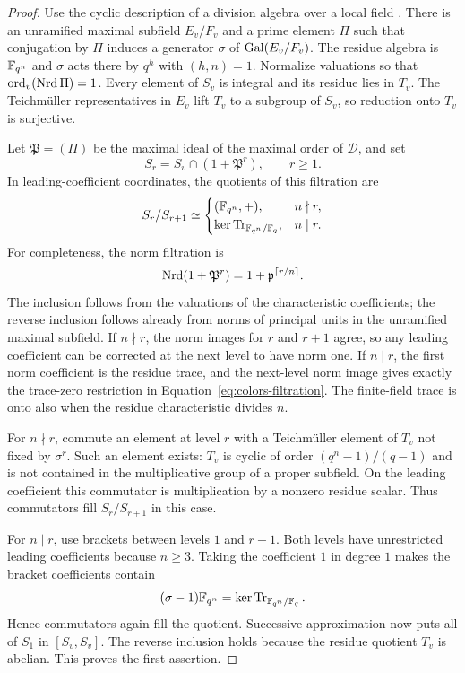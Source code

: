 \begin{proof}
Use the cyclic description of a division algebra over a local field
\cite{Reiner}.  There is an unramified maximal subfield $E_v/F_v$ and
a prime element $\Pi$ such that conjugation by $\Pi$ induces a generator
$\sigma$ of $\operatorname{Gal}(E_v/F_v)$.  The residue algebra is $\mathbb F_{q^n}$ and
$\sigma$ acts there by $q^h$ with $(h,n)=1$.  Normalize valuations so
that $\operatorname{ord}_v(\operatorname{Nrd}\Pi)=1$.  Every element of $S_v$ is integral and its
residue lies in $T_v$.  The Teichm\"uller representatives in $E_v$ lift
$T_v$ to a subgroup of $S_v$, so reduction onto $T_v$ is surjective.

Let $\mathfrak P=(\Pi)$ be the maximal ideal of the maximal order of
$\mathcal D$, and set
\[
 S_r=S_v\cap(1+\mathfrak P^r),\qquad r\geq1.
\]
In leading-coefficient coordinates, the quotients of this filtration
are
\begin{equation}\label{eq:colors-filtration}
 S_r/S_{r+1}\simeq
 \begin{cases}
  (\mathbb F_{q^n},+),&n\nmid r,\\
  \ker\operatorname{Tr}_{\mathbb F_{q^n}/\mathbb F_q},&n\mid r.
 \end{cases}
\end{equation}
For completeness, the norm filtration is
\[
 \operatorname{Nrd}(1+\mathfrak P^r)=1+\mathfrak p^{\lceil r/n\rceil}.
\]
The inclusion follows from the valuations of the characteristic
coefficients; the reverse inclusion follows already from norms of
principal units in the unramified maximal subfield.  If $n\nmid r$,
the norm images for $r$ and $r+1$ agree, so any leading coefficient can
be corrected at the next level to have norm one.  If $n\mid r$, the
first norm coefficient is the residue trace, and the next-level norm
image gives exactly the trace-zero restriction in
Equation~\eqref{eq:colors-filtration}.  The finite-field trace is onto
also when the residue characteristic divides $n$.

For $n\nmid r$, commute an element at level $r$ with a Teichm\"uller
element of $T_v$ not fixed by $\sigma^r$.  Such an element exists:
$T_v$ is cyclic of order $(q^n-1)/(q-1)$ and is not contained in the
multiplicative group of a proper subfield.  On the leading coefficient
this commutator is multiplication by a nonzero residue scalar.
Thus commutators fill $S_r/S_{r+1}$ in this case.

For $n\mid r$, use brackets between levels $1$ and $r-1$.  Both levels
have unrestricted leading coefficients because $n\geq3$.  Taking the
coefficient $1$ in degree $1$ makes the bracket coefficients contain
\[
 (\sigma-1)\mathbb F_{q^n}=\ker\operatorname{Tr}_{\mathbb F_{q^n}/\mathbb F_q}.
\]
Hence commutators again fill the quotient.  Successive approximation
now puts all of $S_1$ in $\overline{[S_v,S_v]}$.  The reverse inclusion
holds because the residue quotient $T_v$ is abelian.  This proves the
first assertion.


\end{proof}
